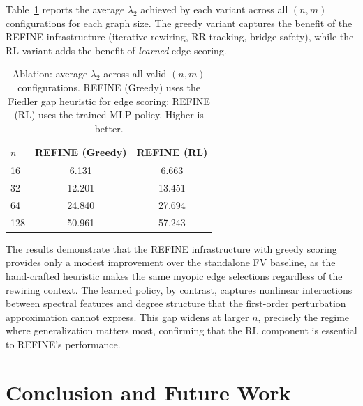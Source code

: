 \documentclass{article}
\begin{document}
Table~\ref{tab:ablation} reports the average $\lambda_2$ achieved by each variant across all $(n,m)$ configurations for each graph size. The greedy variant captures the benefit of the REFINE infrastructure (iterative rewiring, RR tracking, bridge safety), while the RL variant adds the benefit of \emph{learned} edge scoring.

\begin{table}[t]
\centering
\caption{Ablation: average $\lambda_2$ across all valid $(n, m)$ configurations. REFINE (Greedy) uses the Fiedler gap heuristic for edge scoring; REFINE (RL) uses the trained MLP policy. Higher is better.}\label{tab:ablation}
\begin{tabular}{@{}lcc@{}}
\toprule
$n$ & \textbf{REFINE (Greedy)} & \textbf{REFINE (RL)} \\
\midrule
16  & 6.131  & 6.663 \\
32  & 12.201  & 13.451 \\
64  & 24.840  &  27.694 \\
128 & 50.961  & 57.243  \\
\bottomrule
\end{tabular}
\end{table}

The results demonstrate that the REFINE infrastructure with greedy scoring provides only a modest improvement over the standalone FV baseline, as the hand-crafted heuristic makes the same myopic edge selections regardless of the rewiring context. The learned policy, by contrast, captures nonlinear interactions between spectral features and degree structure that the first-order perturbation approximation cannot express. This gap widens at larger $n$, precisely the regime where generalization matters most, confirming that the RL component is essential to REFINE's performance.


\section{Conclusion and Future Work}















  

\end{document}
